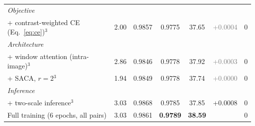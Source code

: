 \begin{table}[t]
\begin{tabular}{lcccccc}
\multicolumn{7}{l}{\textit{Objective}} \\
+ contrast-weighted CE (Eq.~\eqref{eq:ce})$^{3}$ & 2.00 & 0.9857 & 0.9775 & 37.65 & \textcolor{gray}{+0.0004} & $0$ \\
\multicolumn{7}{l}{\textit{Architecture}} \\
+ window attention (intra-image)$^{3}$ & 2.86 & 0.9846 & 0.9778 & 37.92 & \textcolor{gray}{+0.0003} & $0$ \\
+ SACA, $r=2$$^{3}$ & 1.94 & 0.9849 & 0.9778 & 37.74 & \textcolor{gray}{+0.0000} & $0$ \\
\multicolumn{7}{l}{\textit{Inference}} \\
+ two-scale inference$^{3}$ & 3.03 & 0.9868 & 0.9785 & 37.85 & +0.0008 & $0$ \\
\midrule
Full training (6 epochs, all pairs) & 3.03 & 0.9861 & \textbf{0.9789} & \textbf{38.59} & & $0$ \\
\bottomrule
\end{tabular}
\end{table}

